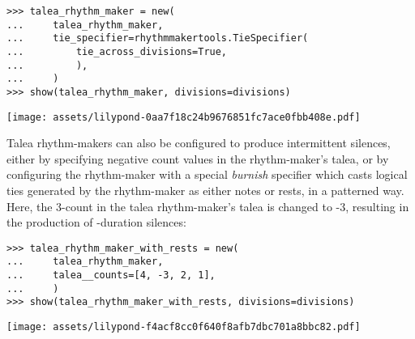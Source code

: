 \begin{comment}
<abjad>
talea_rhythm_maker = new(
    talea_rhythm_maker,
    tie_specifier=rhythmmakertools.TieSpecifier(
        tie_across_divisions=True,
        ),
    )
show(talea_rhythm_maker, divisions=divisions)
</abjad>
\end{comment}

\begin{abjadbookoutput}
\begin{singlespacing}
\vspace{-0.5\baselineskip}
\begin{verbatim}
>>> talea_rhythm_maker = new(
...     talea_rhythm_maker,
...     tie_specifier=rhythmmakertools.TieSpecifier(
...         tie_across_divisions=True,
...         ),
...     )
>>> show(talea_rhythm_maker, divisions=divisions)
\end{verbatim}
\noindent\texttt{[image: assets/lilypond-0aa7f18c24b9676851fc7ace0fbb408e.pdf]}
\end{singlespacing}
\end{abjadbookoutput}

\noindent Talea rhythm-makers can also be configured to produce intermittent
silences, either by specifying negative count values in the rhythm-maker's
talea, or by configuring the rhythm-maker with a special \emph{burnish}
specifier which casts logical ties generated by the rhythm-maker as either
notes or rests, in a patterned way. Here, the 3-count in the talea
rhythm-maker's talea is changed to -3, resulting in the production of
-duration silences:

\begin{comment}
<abjad>
talea_rhythm_maker_with_rests = new(
    talea_rhythm_maker,
    talea__counts=[4, -3, 2, 1],
    )
show(talea_rhythm_maker_with_rests, divisions=divisions)
</abjad>
\end{comment}

\begin{abjadbookoutput}
\begin{singlespacing}
\vspace{-0.5\baselineskip}
\begin{verbatim}
>>> talea_rhythm_maker_with_rests = new(
...     talea_rhythm_maker,
...     talea__counts=[4, -3, 2, 1],
...     )
>>> show(talea_rhythm_maker_with_rests, divisions=divisions)
\end{verbatim}
\noindent\texttt{[image: assets/lilypond-f4acf8cc0f640f8afb7dbc701a8bbc82.pdf]}
\end{singlespacing}
\end{abjadbookoutput}

